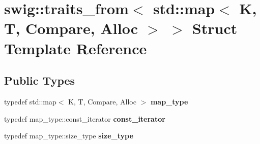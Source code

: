 \hypertarget{structswig_1_1traits__from_3_01std_1_1map_3_01K_00_01T_00_01Compare_00_01Alloc_01_4_01_4}{}\section{swig\+:\+:traits\+\_\+from$<$ std\+:\+:map$<$ K, T, Compare, Alloc $>$ $>$ Struct Template Reference}
\label{structswig_1_1traits__from_3_01std_1_1map_3_01K_00_01T_00_01Compare_00_01Alloc_01_4_01_4}
\subsection*{Public Types}
\begin{DoxyCompactItemize}
\item 
typedef std\+::map$<$ K, T, Compare, Alloc $>$ {\bfseries map\+\_\+type}\hypertarget{structswig_1_1traits__from_3_01std_1_1map_3_01K_00_01T_00_01Compare_00_01Alloc_01_4_01_4_a9b1b18fe3260445279169d47a71caf5f}{}\label{structswig_1_1traits__from_3_01std_1_1map_3_01K_00_01T_00_01Compare_00_01Alloc_01_4_01_4_a9b1b18fe3260445279169d47a71caf5f}

\item 
typedef map\+\_\+type\+::const\+\_\+iterator {\bfseries const\+\_\+iterator}\hypertarget{structswig_1_1traits__from_3_01std_1_1map_3_01K_00_01T_00_01Compare_00_01Alloc_01_4_01_4_a79bfdd6c1c4f9d06cc15348c56bfe5be}{}\label{structswig_1_1traits__from_3_01std_1_1map_3_01K_00_01T_00_01Compare_00_01Alloc_01_4_01_4_a79bfdd6c1c4f9d06cc15348c56bfe5be}

\item 
typedef map\+\_\+type\+::size\+\_\+type {\bfseries size\+\_\+type}\hypertarget{structswig_1_1traits__from_3_01std_1_1map_3_01K_00_01T_00_01Compare_00_01Alloc_01_4_01_4_aff705e529c0e316017d57d0e99396ac5}{}\label{structswig_1_1traits__from_3_01std_1_1map_3_01K_00_01T_00_01Compare_00_01Alloc_01_4_01_4_aff705e529c0e316017d57d0e99396ac5}

\end{DoxyCompactItemize}
